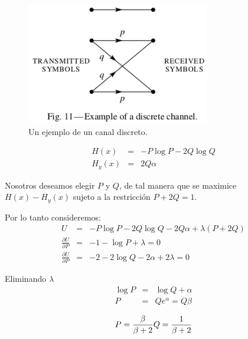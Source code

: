 \begin{figure}[!ht]
\centerline{\includegraphics[width=80mm]{Imagenes/Pagina25-Figura11.png}}
\caption{Un ejemplo de un canal discreto.}
\label{fig:11}
\end{figure}

\begin{equation}
\begin{array}{rcl}
H(x) &=& -P\log{P} - 2Q\log{Q} \\
H_y(x) &=& 2Q\alpha
\end{array}
\end{equation}

Nosotros deseamos elegir $P$ y $Q$, de tal manera que se maximice
$H(x) - H_y(x)$ sujeto a la restricci\'on $P + 2Q = 1$.

Por lo tanto consideremos:
\begingroup
\renewcommand*{\arraystretch}{2.0}
\begin{equation}
\begin{array}{rcl}
U &=& -P\log{P} - 2Q\log{Q} -2Q\alpha + \lambda(P+2Q) \\
\displaystyle\frac{{\partial U}}{{\partial P}} &=& -1 - \log{P} + \lambda = 0 \\
\displaystyle\frac{{\partial U}}{{\partial P}} &=& -2 - 2\log{Q} -2\alpha + 2\lambda = 0
\end{array}
\end{equation}
\endgroup

Eliminando $\lambda$
\begin{equation}
\begin{array}{rcl}
\log{P} &=& \log{Q} + \alpha \\
P &=& Q e^\alpha = Q\beta 
\end{array}
\end{equation}

\begin{equation}
  P = \frac{\beta}{\beta + 2} \\ 
  Q = \frac{1}{\beta + 2}
\end{equation}

